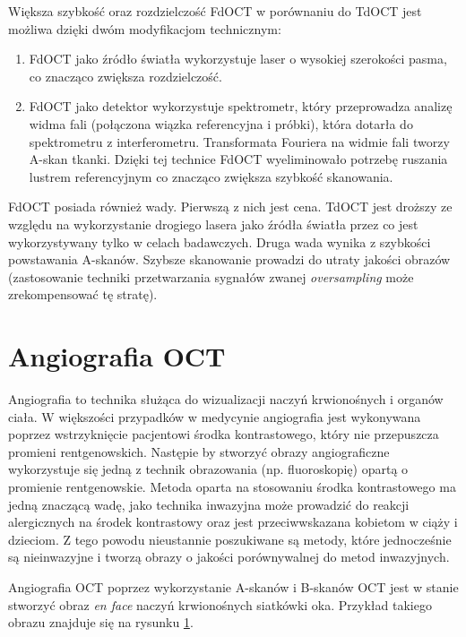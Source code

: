 Większa szybkość oraz rozdzielczość FdOCT w porównaniu do TdOCT jest możliwa dzięki dwóm modyfikacjom technicznym:

\begin{enumerate}

\item FdOCT jako źródło światła wykorzystuje laser o wysokiej szerokości pasma, co znacząco zwiększa rozdzielczość.
\item FdOCT jako detektor wykorzystuje spektrometr, który przeprowadza analizę widma fali (połączona wiązka referencyjna i próbki), która dotarła do spektrometru z interferometru. Transformata Fouriera na widmie fali tworzy A-skan tkanki. Dzięki tej technice FdOCT wyeliminowało potrzebę ruszania lustrem referencyjnym co znacząco zwiększa szybkość skanowania.

\end{enumerate}

FdOCT posiada również wady. Pierwszą z nich jest cena. TdOCT jest droższy ze względu na wykorzystanie drogiego lasera jako źródła światła przez co jest wykorzystywany tylko w celach badawczych. Druga wada wynika z szybkości powstawania A-skanów. Szybsze skanowanie prowadzi do utraty jakości obrazów (zastosowanie techniki przetwarzania sygnałów zwanej \textit{oversampling} może zrekompensować tę stratę).


\section{Angiografia OCT}
\label{sec:obrazowanie_oct:angiografia_oct}

Angiografia to technika służąca do wizualizacji naczyń krwionośnych i organów ciała. W większości przypadków w medycynie angiografia jest wykonywana poprzez wstrzyknięcie pacjentowi środka kontrastowego, który nie przepuszcza promieni rentgenowskich. Następie by stworzyć obrazy angiograficzne wykorzystuje się jedną z technik obrazowania (np. fluoroskopię) opartą o promienie rentgenowskie. Metoda oparta na stosowaniu środka kontrastowego ma jedną znaczącą wadę, jako technika inwazyjna może prowadzić do reakcji alergicznych na środek kontrastowy oraz jest przeciwwskazana kobietom w ciąży i dzieciom. Z tego powodu nieustannie poszukiwane są metody, które jednocześnie są nieinwazyjne i tworzą obrazy o jakości porównywalnej do metod inwazyjnych.

Angiografia OCT poprzez wykorzystanie A-skanów i B-skanów OCT jest w stanie stworzyć obraz \textit{en face} naczyń krwionośnych siatkówki oka. Przykład takiego obrazu znajduje się na rysunku \ref{sec:obrazowanie_oct:angiografia_oct}.

